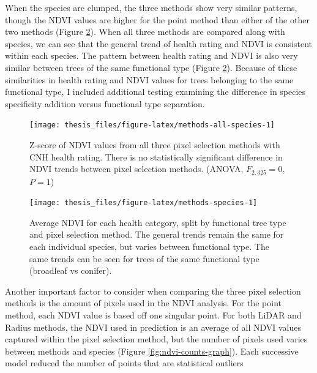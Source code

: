 \documentclass[12pt,twoside]{reedthesis}
\begin{document}
When the species are clumped, the three methods show very similar
patterns, though the NDVI values are higher for the point method than
either of the other two methods (Figure \ref{fig:methods-species}).
When all three methods are compared along with species, we can see that
the general trend of health rating and NDVI is consistent within each
species. The pattern between health rating and NDVI is also very similar
between trees of the same functional type (Figure
\ref{fig:methods-species}). Because of these similarities in health
rating and NDVI values for trees belonging to the same functional type,
I included additional testing examining the difference in species
specificity addition versus functional type separation.
\begin{figure}

{\centering \texttt{[image: thesis\_files/figure-latex/methods-all-species-1]} 

}

\caption[Z-score of NDVI and health rating comparison across methods]{Z-score of NDVI values from all three pixel selection methods with CNH health rating. There is no statistically significant difference in NDVI trends between pixel selection methods. (ANOVA, $F_{2, 325}=0$, $P = 1$)}\label{fig:methods-all-species}
\end{figure}
\begin{figure}

{\centering \texttt{[image: thesis\_files/figure-latex/methods-species-1]} 

}

\caption[Average NDVI comparison between species and methods.]{Average NDVI for each health category, split by functional tree type and pixel selection method. The general trends remain the same for each individual species, but varies between functional type. The same trends can be seen for trees of the same functional type (broadleaf vs conifer).}\label{fig:methods-species}
\end{figure}
Another important factor to consider when comparing the three pixel
selection methods is the amount of pixels used in the NDVI analysis. For
the point method, each NDVI value is based off one singular point. For
both LiDAR and Radius methods, the NDVI used in prediction is an average
of all NDVI values captured within the pixel selection method, but the
number of pixels used varies between methods and species (Figure
\ref{fig:ndvi-counts-graph}). Each successive model reduced the number
of points that are statistical outliers
\end{document}
